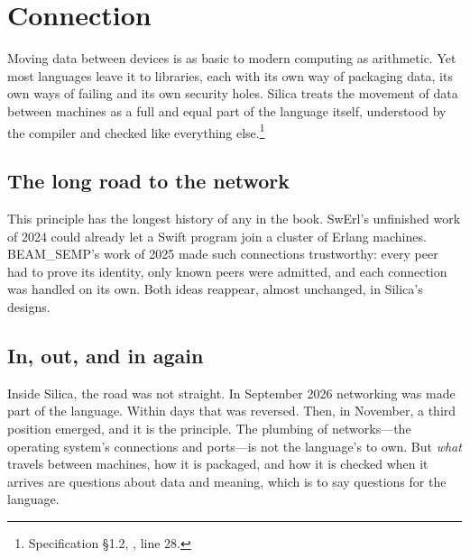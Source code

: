 \chapter{Connection}
\label{ch:transport}

Moving data between devices is as basic to modern computing as arithmetic.
Yet most languages leave it to libraries, each with its own way of packaging
data, its own ways of failing and its own security holes. Silica treats the
movement of data between machines as a full and equal part of the language
itself, understood by the compiler and checked like everything
else.\footnote{Specification §1.2,
, line 28.}

\section{The long road to the network}

This principle has the longest history of any in the book. SwErl's unfinished
work of 2024 could already let a Swift program join a cluster of Erlang
machines. BEAM\_SEMP's work of 2025 made such connections trustworthy: every
peer had to prove its identity, only known peers were admitted, and each
connection was handled on its own. Both ideas reappear, almost unchanged, in
Silica's designs.

\section{In, out, and in again}

Inside Silica, the road was not straight. In September 2026 networking was
made part of the language. Within days that was reversed. Then, in November, a
third position emerged, and it is the principle. The plumbing of networks---the
operating system's connections and ports---is not the language's to own. But
\emph{what} travels between machines, how it is packaged, and how it is checked
when it arrives are questions about data and meaning, which is to say questions
for the language.

